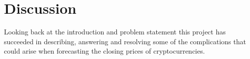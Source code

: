\chapter{Discussion}
Looking back at the introduction and problem statement this project has succeeded in describing, answering and resolving some of the complications that could arise when forecasting the closing prices of cryptocurrencies. 